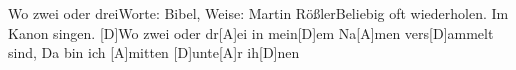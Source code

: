 \documentclass[../main.tex]{subfiles}
\begin{document}
\begin{songwithoutpagebreak}{Wo zwei oder drei}{Worte: Bibel, Weise: Martin Rößler}{Beliebig oft wiederholen. Im Kanon singen.}
[D]Wo zwei oder dr[A]ei in mein[D]em Na[A]men vers[D]ammelt sind,
Da bin ich [A]mitten [D]unte[A]r ih[D]nen
\end{songwithoutpagebreak}
\end{document}
